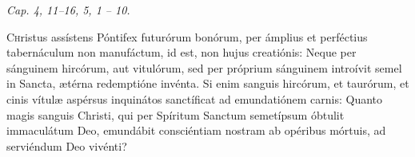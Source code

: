 
{\hfill \textit{Cap. 4, 11–16, 5, 1 – 10.}} 



\lettrine{C}{h}ristus assístens Póntifex futurórum bonórum, per ámplius et perféctius tabernáculum non manufáctum, id est, non hujus creatiónis:
Neque per sánguinem hircórum, aut vitulórum, sed per próprium sánguinem introívit semel in Sancta, ætérna redemptióne invénta.
Si enim sanguis hircórum, et taurórum, et cinis vítulæ aspérsus inquinátos sanctíficat ad emundatiónem carnis:
Quanto magis sanguis Christi, qui per Spíritum Sanctum semetípsum óbtulit immaculátum Deo, emundábit consciéntiam nostram ab opéribus mórtuis, ad serviéndum Deo vivénti?